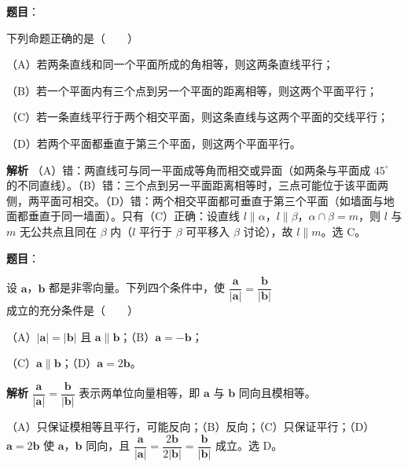 \begin{answer}

\textbf{题目}：

下列命题正确的是\mbox{（　　）}

（A）若两条直线和同一个平面所成的角相等，则这两条直线平行；

（B）若一个平面内有三个点到另一个平面的距离相等，则这两个平面平行；

（C）若一条直线平行于两个相交平面，则这条直线与这两个平面的交线平行；

（D）若两个平面都垂直于第三个平面，则这两个平面平行。

\textbf{解析}
（A）错：两直线可与同一平面成等角而相交或异面（如两条与平面成 $45^\circ$ 的不同直线）。（B）错：三个点到另一平面距离相等时，三点可能位于该平面两侧，两平面可相交。（D）错：两个相交平面都可垂直于第三个平面（如墙面与地面都垂直于同一墙面）。只有（C）正确：设直线 $l\parallel\alpha$，$l\parallel\beta$，$\alpha\cap\beta=m$，则 $l$ 与 $m$ 无公共点且同在 $\beta$ 内（$l$ 平行于 $\beta$ 可平移入 $\beta$ 讨论），故 $l\parallel m$。选 C。


\end{answer}
\begin{answer}

\textbf{题目}：

设 $\boldsymbol a$，$\boldsymbol b$ 都是非零向量。下列四个条件中，使 $\dfrac{\boldsymbol a}{|\boldsymbol a|}=\dfrac{\boldsymbol b}{|\boldsymbol b|}$ 成立的充分条件是\mbox{（　　）}

（A）$|\boldsymbol a|=|\boldsymbol b|$ 且 $\boldsymbol a\parallel\boldsymbol b$；（B）$\boldsymbol a=-\boldsymbol b$；

（C）$\boldsymbol a\parallel\boldsymbol b$；（D）$\boldsymbol a=2\boldsymbol b$。

\textbf{解析}
$\dfrac{\boldsymbol a}{|\boldsymbol a|}=\dfrac{\boldsymbol b}{|\boldsymbol b|}$ 表示两单位向量相等，即 $\boldsymbol a$ 与 $\boldsymbol b$ 同向且模相等。

（A）只保证模相等且平行，可能反向；（B）反向；（C）只保证平行；（D）$\boldsymbol a=2\boldsymbol b$ 使 $\boldsymbol a$，$\boldsymbol b$ 同向，且 $\dfrac{\boldsymbol a}{|\boldsymbol a|}=\dfrac{2\boldsymbol b}{2|\boldsymbol b|}=\dfrac{\boldsymbol b}{|\boldsymbol b|}$ 成立。选 D。


\end{answer}
